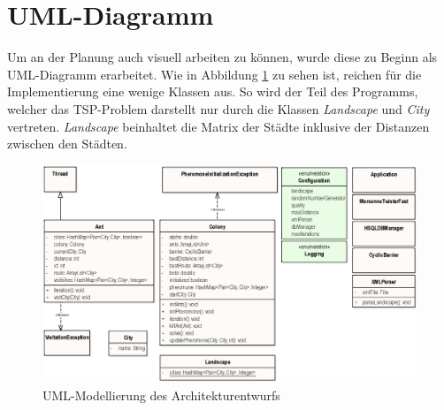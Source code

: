 \section{UML-Diagramm}{
	Um an der Planung auch visuell arbeiten zu können, wurde diese zu Beginn als UML-Diagramm erarbeitet. Wie in Abbildung \ref{uml_class} zu sehen ist, reichen für die Implementierung eine wenige Klassen aus. So wird der Teil des Programms, welcher das TSP-Problem darstellt nur durch die Klassen \textit{Landscape} und \textit{City} vertreten.
	\textit{Landscape} beinhaltet die Matrix der Städte inklusive der Distanzen zwischen den Städten.
	\begin{figure}
		\centering
		\includegraphics[width=0.9\linewidth]{images/classModel.eps}
		\caption{UML-Modellierung des Architekturentwurfs}
		\label{uml_class}
	\end{figure}

}